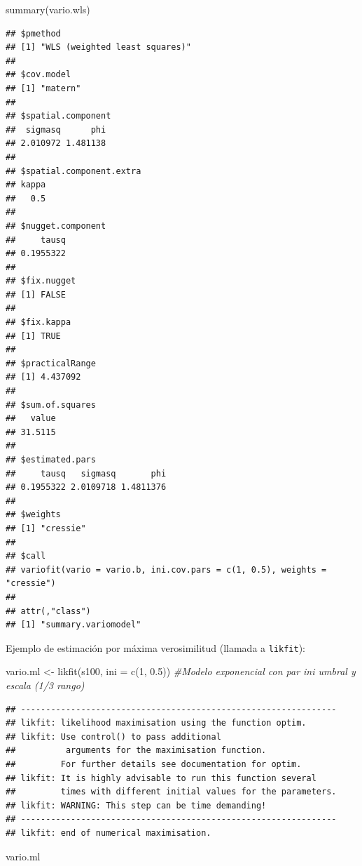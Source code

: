 \documentclass[
  spanish,
]{book}
\newenvironment{Shaded}{\begin{snugshade}}{\end{snugshade}}
\newcommand{\AttributeTok}[1]{\textcolor[rgb]{0.77,0.63,0.00}{#1}}
\newcommand{\CommentTok}[1]{\textcolor[rgb]{0.56,0.35,0.01}{\textit{#1}}}
\newcommand{\DecValTok}[1]{\textcolor[rgb]{0.00,0.00,0.81}{#1}}
\newcommand{\FloatTok}[1]{\textcolor[rgb]{0.00,0.00,0.81}{#1}}
\newcommand{\FunctionTok}[1]{\textcolor[rgb]{0.00,0.00,0.00}{#1}}
\newcommand{\NormalTok}[1]{#1}
\newcommand{\OtherTok}[1]{\textcolor[rgb]{0.56,0.35,0.01}{#1}}
\theoremstyle{break}
\begin{document}
\begin{Shaded}
\begin{Highlighting}[]
\FunctionTok{summary}\NormalTok{(vario.wls)}
\end{Highlighting}
\end{Shaded}

\begin{verbatim}
## $pmethod
## [1] "WLS (weighted least squares)"
## 
## $cov.model
## [1] "matern"
## 
## $spatial.component
##  sigmasq      phi 
## 2.010972 1.481138 
## 
## $spatial.component.extra
## kappa 
##   0.5 
## 
## $nugget.component
##     tausq 
## 0.1955322 
## 
## $fix.nugget
## [1] FALSE
## 
## $fix.kappa
## [1] TRUE
## 
## $practicalRange
## [1] 4.437092
## 
## $sum.of.squares
##   value 
## 31.5115 
## 
## $estimated.pars
##     tausq   sigmasq       phi 
## 0.1955322 2.0109718 1.4811376 
## 
## $weights
## [1] "cressie"
## 
## $call
## variofit(vario = vario.b, ini.cov.pars = c(1, 0.5), weights = "cressie")
## 
## attr(,"class")
## [1] "summary.variomodel"
\end{verbatim}

Ejemplo de estimación por máxima verosimilitud (llamada a \texttt{likfit}):

\begin{Shaded}
\begin{Highlighting}[]
\NormalTok{vario.ml }\OtherTok{\textless{}{-}} \FunctionTok{likfit}\NormalTok{(s100, }\AttributeTok{ini =} \FunctionTok{c}\NormalTok{(}\DecValTok{1}\NormalTok{, }\FloatTok{0.5}\NormalTok{)) }\CommentTok{\#Modelo exponencial con par ini umbral y escala (1/3 rango)}
\end{Highlighting}
\end{Shaded}

\begin{verbatim}
## ---------------------------------------------------------------
## likfit: likelihood maximisation using the function optim.
## likfit: Use control() to pass additional
##          arguments for the maximisation function.
##         For further details see documentation for optim.
## likfit: It is highly advisable to run this function several
##         times with different initial values for the parameters.
## likfit: WARNING: This step can be time demanding!
## ---------------------------------------------------------------
## likfit: end of numerical maximisation.
\end{verbatim}

\begin{Shaded}
\begin{Highlighting}[]
\NormalTok{vario.ml}
\end{Highlighting}
\end{Shaded}
\end{document}
